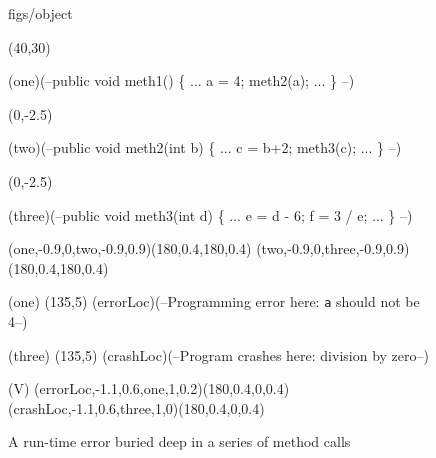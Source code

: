 


 
\begin {figure}

\Draw

 {figs/object}

\MinNodeSize(40,30)

\ORectNode(one)(--public void meth1()	\hfill
               \{  ... 		\hfill
                  a = 4;  	\hfill
                  meth2(a);	\hfill
                  ...		\hfill
               \} 		\hfill
		--)

\MoveToExit(0,-2.5)

\ORectNode(two)(--public void meth2(int b)	\hfill
               \{  ... 		\hfill
                  c = b+2;	\hfill
                  meth3(c);	\hfill
                  ...		\hfill
               \} 		\hfill
		--)

\MoveToExit(0,-2.5)

\ORectNode(three)(--public void meth3(int d)	\hfill
               \{  ... 		\hfill
                  e = d - 6;	\hfill
                  f = 3 / e;   	\hfill
                  ...		\hfill
               \} 		\hfill
		--)


\CurvedEdgeAt(one,-0.9,0,two,-0.9,0.9)(180,0.4,180,0.4)
\CurvedEdgeAt(two,-0.9,0,three,-0.9,0.9)(180,0.4,180,0.4)

\MoveToLoc(one)
\Move(135,5)
\Node(errorLoc)(--Programming error here:
\texttt{a} should not be 4--)

\MoveToLoc(three)
\Move(135,5)
\Node(crashLoc)(--Program crashes here:
division by zero--)

\ArrowSpec(V)
\CurvedEdgeAt(errorLoc,-1.1,0.6,one,1,0.2)(180,0.4,0,0.4)
\CurvedEdgeAt(crashLoc,-1.1,0.6,three,1,0)(180,0.4,0,0.4)


\EndDraw

\caption {A run-time error buried deep in a series of 
method calls}

\label {fig:buriedError}

\end {figure}


